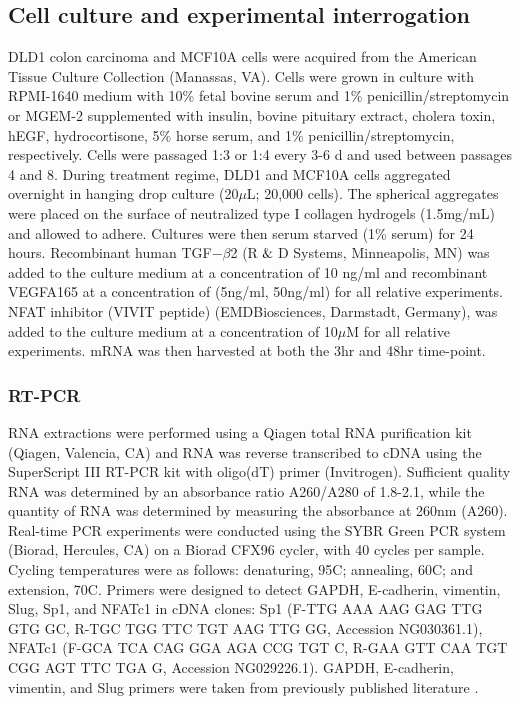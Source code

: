 \documentclass[11pt,letterpaper]{article}
\begin{document}
\subsection*{Cell culture and experimental interrogation}
DLD1 colon carcinoma and MCF10A cells were acquired from the American Tissue Culture Collection (Manassas, VA). Cells were grown in culture with RPMI-1640 medium with 10\% fetal bovine serum and 1\% penicillin/streptomycin or MGEM-2 supplemented with insulin, bovine pituitary extract, cholera toxin, hEGF, hydrocortisone, 5\% horse serum, and 1\% penicillin/streptomycin, respectively.  Cells were passaged 1:3 or 1:4 every 3-6 d and used between passages 4 and 8.  During treatment regime, DLD1 and MCF10A cells aggregated overnight in hanging drop culture (20$\mu$L; 20,000 cells).  The spherical aggregates were placed on the surface of neutralized type I collagen hydrogels (1.5mg/mL) and allowed to adhere.  Cultures were then serum starved (1\% serum) for 24 hours.  Recombinant human TGF$-\beta$2 (R$\And$D Systems, Minneapolis, MN) was added to the culture medium at a concentration of 10 ng/ml and recombinant VEGFA165 at a concentration of (5ng/ml, 50ng/ml) for all relative experiments.  NFAT inhibitor (VIVIT peptide) (EMDBiosciences, Darmstadt, Germany), was added to the culture medium at a concentration of 10$\mu$M for all relative experiments.  mRNA was then harvested at both the 3hr and 48hr time-point.

\subsubsection*{RT-PCR}
RNA extractions were performed using a Qiagen total RNA purification kit (Qiagen, Valencia, CA) and RNA was reverse transcribed to cDNA using the SuperScript III RT-PCR kit with oligo(dT) primer (Invitrogen).  Sufficient quality RNA was determined by an absorbance ratio A260/A280 of 1.8-2.1, while the quantity of RNA was determined by measuring the absorbance at 260nm (A260).  Real-time PCR experiments were conducted using the SYBR Green PCR system (Biorad, Hercules, CA) on a Biorad CFX96 cycler, with 40 cycles per sample. Cycling temperatures were as follows: denaturing, 95C; annealing, 60C; and extension, 70C.  Primers were designed to detect GAPDH, E-cadherin, vimentin, Slug, Sp1, and NFATc1 in cDNA clones: Sp1 (F-TTG AAA AAG GAG TTG GTG GC, R-TGC TGG TTC TGT AAG TTG GG, Accession NG030361.1), NFATc1 (F-GCA TCA CAG GGA AGA CCG TGT C, R-GAA GTT CAA TGT CGG AGT TTC TGA G, Accession  NG029226.1).  GAPDH, E-cadherin, vimentin, and Slug primers were taken from previously published literature \cite{Medici:2008fk}.
\end{document}
